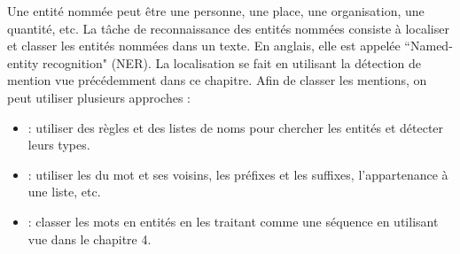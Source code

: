 \documentclass{KodeBook}
\begin{document}
Une entité nommée peut être une personne, une place, une organisation, une quantité, etc.
La tâche de reconnaissance des entités nommées consiste à localiser et classer les entités nommées dans un texte. 
En anglais, elle est appelée ``Named-entity recognition" (NER). 
La localisation se fait en utilisant la détection de mention vue précédemment dans ce chapitre.
Afin de classer les mentions, on peut utiliser plusieurs approches :
\begin{itemize}
	\item {} : utiliser des règles et des listes de noms pour chercher les entités et détecter leurs types.
	\item {} : utiliser les  du mot et ses voisins, les préfixes et les suffixes, l'appartenance à une liste, etc.
	\item {} : classer les mots en entités en les traitant comme une séquence en utilisant  vue dans le chapitre 4.
	
\end{itemize}
\end{document}
